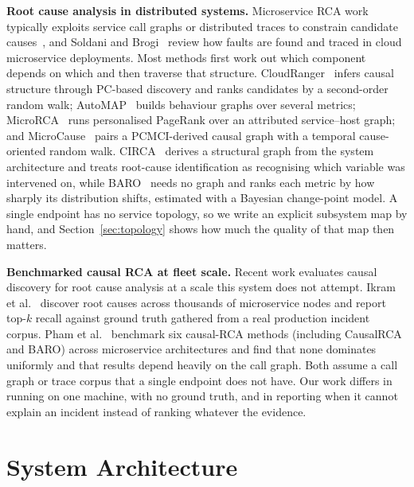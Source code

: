 \documentclass[conference,a4paper]{IEEEtran}
\begin{document}
\textbf{Root cause analysis in distributed systems.} Microservice RCA work
typically exploits service call graphs or distributed traces to constrain
candidate causes~\cite{kim2013root, chen2014causeinfer}, and Soldani and
Brogi~\cite{soldani2022survey} review how faults are found and traced in
cloud microservice deployments. Most methods first work out which component
depends on which and then traverse that structure.
CloudRanger~\cite{wang2018cloudranger} infers causal structure through
PC-based discovery and ranks candidates by a second-order random walk; AutoMAP~\cite{ma2020automap} builds behaviour graphs over several
metrics; MicroRCA~\cite{wu2020microrca} runs personalised PageRank over an
attributed service--host graph; and MicroCause~\cite{meng2020microcause} pairs
a PCMCI-derived causal graph with a temporal cause-oriented random walk.
CIRCA~\cite{li2022circa} derives a structural graph from the system
architecture and treats root-cause identification as recognising which
variable was intervened on, while BARO~\cite{pham2024baro} needs no graph and
ranks each metric by how sharply its distribution shifts, estimated with a
Bayesian change-point model. A
single endpoint has no service topology, so we write an explicit subsystem map
by hand, and Section~\ref{sec:topology} shows how much the quality of that map
then matters.

\textbf{Benchmarked causal RCA at fleet scale.} Recent work evaluates causal
discovery for root cause analysis at a scale this system does not attempt.
Ikram et al.~\cite{ikram2022root} discover root causes across thousands of
microservice nodes and report top-$k$ recall against ground truth gathered
from a real production incident corpus. Pham et al.~\cite{pham2024root}
benchmark six causal-RCA methods (including CausalRCA and BARO) across
microservice architectures and find that none dominates uniformly and that
results depend heavily on the call graph. Both assume a call graph or trace
corpus that a single endpoint does not have. Our work differs in running on
one machine, with no ground truth, and in reporting when it cannot explain an
incident instead of ranking whatever the evidence.

\section{System Architecture}
\end{document}
